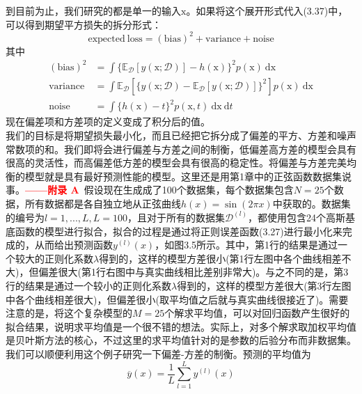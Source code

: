 \documentclass[b5paper]{book}
\numberwithin{equation}{chapter}
\newcommand {\bx} {\boldsymbol{\mathrm{x}}}
\newcommand {\rmd} {\mathrm{d}}
\begin{document}
{	\indent 到目前为止，我们研究的都是单一的输入$\bx$。如果将这个展开形式代入(3.37)中，可以得到期望平方损失的拆分形式：
	\begin{equation}
		\mathrm{expected\ loss = (bias)^2 + variance + noise}
	\end{equation}
	其中
	\begin{align}
		\mathrm{(bias)^2} &= \int \{\mathbb{E}_{\mathcal{D}}[y(\bx;\mathcal{D})]-h(\bx)\}^2 p(\bx)\ \mathrm{d}\bx\\
		\mathrm{variance} &= \int \mathbb{E}_{\mathcal{D}}[\{y(\bx;\mathcal{D}) - \mathbb{E}_{\mathcal{D}}[y(\bx;\mathcal{D})]\}^2]p(\bx)\ \mathrm{d}\bx \\
		\mathrm{noise} &= \int \{h(\bx)-t\}^2 p(\bx,t)\ \rmd \bx \ \rmd t
	\end{align}
	现在偏差项和方差项的定义变成了积分后的值。\\
	\indent 我们的目标是将期望损失最小化，而且已经把它拆分成了偏差的平方、方差和噪声常数项的和。我们即将会进行偏差与方差之间的制衡，低偏差高方差的模型会具有很高的灵活性，而高偏差低方差的模型会具有很高的稳定性。将偏差与方差完美均衡的模型就是具有最好预测性能的模型。这里还是用第1章中的正弦函数数据集说事。\textcolor{red}{\textbf{——附录 A}}\ 假设现在生成成了100个数据集，每个数据集包含$N=25$个数据，所有数据都是各自独立地从正弦曲线$h(x) = \sin (2 \pi x)$中获取的。数据集的编号为$l = 1, ..., L, L=100$，且对于所有的数据集$\mathcal{D}^{(l)}$，都使用包含24个高斯基底函数的模型进行拟合，拟合的过程是通过将正则误差函数(3.27)进行最小化来完成的，从而给出预测函数$y^{(l)}(x)$，如图3.5所示。其中，第1行的结果是通过一个较大的正则化系数$\lambda$得到的，这样的模型方差很小(第1行左图中各个曲线相差不大)，但偏差很大(第1行右图中与真实曲线相比差别非常大)。与之不同的是，第3行的结果是通过一个较小的正则化系数$\lambda$得到的，这样的模型方差很大(第3行左图中各个曲线相差很大)，但偏差很小(取平均值之后就与真实曲线很接近了)。需要注意的是，将这个复杂模型的$M=25$个解求平均值，可以对回归函数产生很好的拟合结果，说明求平均值是一个很不错的想法。实际上，对多个解求取加权平均值是贝叶斯方法的核心，不过这里的求平均值针对的是参数的后验分布而非数据集。\\
	\indent 我们可以顺便利用这个例子研究一下偏差-方差的制衡。预测的平均值为
	\begin{equation}
		\overline{y}(x) = \frac{1}{L} \sum_{l=1}^L y^{(l)}(x)
	\end{equation}
	\newpage
	\begin{figure}[H]
		\begin{minipage}[t]{0.5\linewidth}
		\centering

\end{minipage}
\end{figure}}
\end{document}
